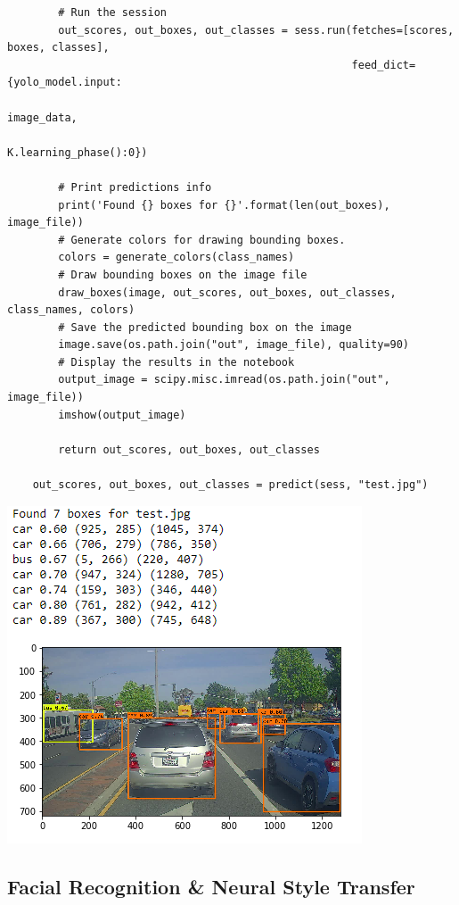 \documentclass[11pt, a4paper]{article}
\begin{document}
\begin{spacing}{1.1}
		\begin{lstlisting}
		# Run the session 
		out_scores, out_boxes, out_classes = sess.run(fetches=[scores, boxes, classes],
		                                              feed_dict={yolo_model.input: 
		                                                         image_data,
		                                                         K.learning_phase():0})
	
		# Print predictions info
		print('Found {} boxes for {}'.format(len(out_boxes), image_file))
		# Generate colors for drawing bounding boxes.
		colors = generate_colors(class_names)
		# Draw bounding boxes on the image file
		draw_boxes(image, out_scores, out_boxes, out_classes, class_names, colors)
		# Save the predicted bounding box on the image
		image.save(os.path.join("out", image_file), quality=90)
		# Display the results in the notebook
		output_image = scipy.misc.imread(os.path.join("out", image_file))
		imshow(output_image)
		
		return out_scores, out_boxes, out_classes 
		
	out_scores, out_boxes, out_classes = predict(sess, "test.jpg") \end{lstlisting} \vspace*{1mm}
	\begin{center}	\includegraphics[scale=.8]{yolo_test}	\end{center} \newpage

	\subsection{Facial Recognition \& Neural Style Transfer}

\end{spacing}
\end{document}
